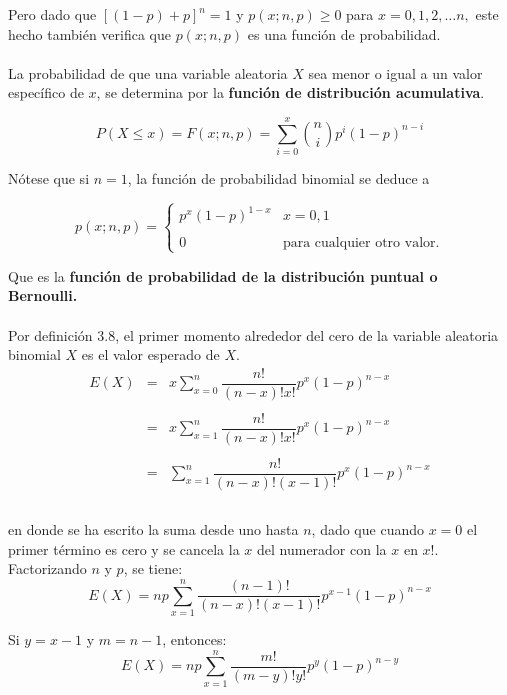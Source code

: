 Pero dado que $[(1-p)+p]^n = 1$ y $p(x;n,p)\geq 0$ para $x=0,1,2,\ldots n,$ este hecho también verifica que $p(x;n,p)$ es una función de probabilidad.\\\\

La probabilidad de que una variable aleatoria $X$ sea menor o igual a un valor específico de $x$, se determina por la \textbf{función de distribución acumulativa}.

\begin{tcolorbox}
    $$P(X\leq x) = F(x;n,p) = \sum_{i=0}^x {n\choose i} p^i (1-p)^{n-i}$$
\end{tcolorbox}

Nótese que si $n=1$, la función de probabilidad binomial se deduce a

\begin{tcolorbox}
    $$p(x;n,p)=\left\{\begin{array}{ll}
	p^x(1-p)^{1-x} & x = 0,1\\\\
	0 & \mbox{para cualquier otro valor}.
    \end{array}\right.$$
\end{tcolorbox}

Que es la \textbf{función de probabilidad de la distribución puntual o Bernoulli.}\\\\

Por definición 3.8, el primer momento alrededor del cero de la variable aleatoria binomial $X$ es el valor esperado de $X$.
$$\begin{array}{rcl}
    E(X) & = & x\sum\limits_{x=0}^n \dfrac{n!}{(n-x)!x!} p^x(1-p)^{n-x}\\\\
	 & = & x\sum\limits_{x=1}^n \dfrac{n!}{(n-x)!x!} p^x(1-p)^{n-x}\\\\
	 & = & \sum\limits_{x=1}^n \dfrac{n!}{(n-x)!(x-1)!} p^x(1-p)^{n-x}\\\\
\end{array}$$

en donde se ha escrito la suma desde uno hasta $n$, dado que cuando $x=0$ el primer término es cero y se cancela la $x$ del numerador con la $x$ en $x!$. Factorizando $n$ y $p$, se tiene: 
$$E(X)=np\sum_{x=1}^n \dfrac{(n-1)!}{(n-x)!(x-1)!}p^{x-1}(1-p)^{n-x}$$

Si $y=x-1$ y $m=n-1$, entonces:
$$E(X)=np\sum_{x=1}^n \dfrac{m!}{(m-y)!y!}p^{y}(1-p)^{n-y}$$

